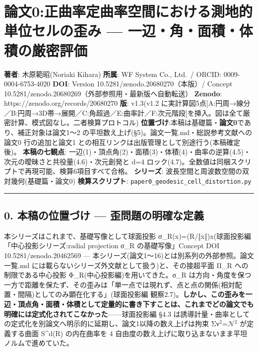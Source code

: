 \documentclass[
]{ltjsarticle}
\author{}
\date{}
\begin{document}
\section{論文0:正曲率定曲率空間における測地的単位セルの歪み ---
一辺・角・面積・体積の厳密評価}\label{ux8ad6ux65870ux6b63ux66f2ux7387ux5b9aux66f2ux7387ux7a7aux9593ux306bux304aux3051ux308bux6e2cux5730ux7684ux5358ux4f4dux30bbux30ebux306eux6b6aux307f-ux4e00ux8fbaux89d2ux9762ux7a4dux4f53ux7a4dux306eux53b3ux5bc6ux8a55ux4fa1}

\textbf{著者}: 木原範昭(Noriaki Kihara) \textbf{所属}: WF System Co.,
Ltd.~/ ORCID: 0009-0004-6753-4020 \textbf{DOI}: Version
10.5281/zenodo.20680270（本版）/ Concept
10.5281/zenodo.20680269（外部参照用・最新版へ自動転送） \textbf{Zenodo}:
https://zenodo.org/records/20680270 \textbf{版}: v1.3(v1.2
に実計算図5点{[}A:円周→線分／B:円周→3D帯→展開／C:角超過／E:曲率計／F:次元階段{]}を挿入。図は全て厳密計算、模式図なし。二者検算プロトコル)
\textbf{位置づけ}:本稿は基礎篇・\textbf{論文0}であり、補正対象は論文1〜2
の平坦数え上げ(§5)。論文一覧.md・総説参考文献への論文0 行の追加と論文1
との相互リンクは出版管理として別途行う(本稿確定後)。
\textbf{本稿の七観点}:
一辺(1)・頂点角(2)・面積(3)・体積(4)・曲率の逆算(4.5)・次元の曖昧さと共役量(4.6)・次元創発と
d=4 ロック(4.7)。全数値は同梱スクリプトで再現可能、検算6項目すべて合格。
\textbf{シリーズ}: 波長空間と周波数空間の双対幾何(基礎篇・論文0)
\textbf{検算スクリプト}: \texttt{paper0\_geodesic\_cell\_distortion.py}

\begin{center}\rule{0.5\linewidth}{0.5pt}\end{center}

\subsection{0. 本稿の位置づけ ---
歪問題の明確な定義}\label{ux672cux7a3fux306eux4f4dux7f6eux3065ux3051-ux6b6aux554fux984cux306eux660eux78baux306aux5b9aux7fa9}

本シリーズはこれまで、基礎写像として球面投影
σ\_R(x)=(R/‖x‖)x(球面投影編「中心投影シリーズ:radial projection σ\_R
の基礎写像」Concept DOI 10.5281/zenodo.20462569 ---
本シリーズ(論文1〜16)とは別系列の外部参照。論文一覧.md
には載らないシリーズ外文献として扱う)と、その接超平面 Π\_R
への制限である中心投影 Φ\_R(中心投影編)を用いてきた。σ\_R
は方向・角度を保つ一方で距離を保たず、その歪みは「単一点では現れず、点と点の関係(相対配置・間隔)としてのみ顕在化する」(球面投影編
観察2.7)。\textbf{しかし、この歪みを一辺・頂点角・面積・体積として定量的に書き下すことは、これまでどの論文でも明確には定式化されてこなかった}------球面投影編
§4.3
は誘導計量・曲率としての定式化を別論文へ明示的に延期し、論文1以降の数え上げは拘束
Σν\(^{2}\)=\(\mathcal{N}\)\(^{2}\) が定義する曲面 S\^{}d(R) の内在曲率を
4 自由度の数え上げに取り込まないまま平坦ノルムで進めていた。
\end{document}
